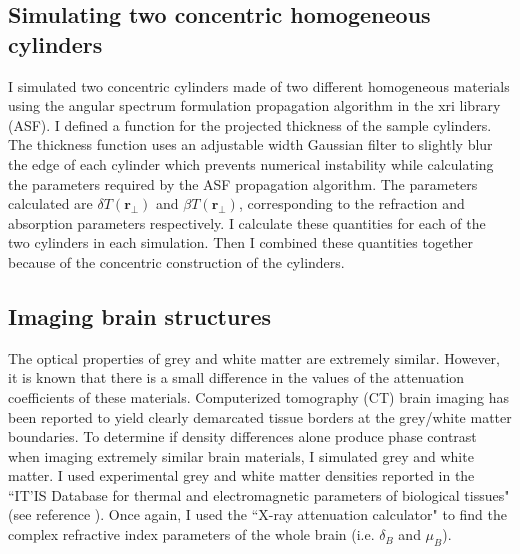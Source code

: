 \documentclass[10pt, a4paper, singlespacing]{report}
\begin{document}

\subsection{Simulating two concentric homogeneous cylinders}\label{2 cylinders}
I simulated two concentric cylinders made of two different homogeneous materials using the angular spectrum formulation propagation algorithm in the xri library (ASF). I defined a function for the projected thickness of the sample cylinders. The thickness function uses an adjustable width Gaussian filter to slightly blur the edge of each cylinder which prevents numerical instability while calculating the parameters required by the ASF propagation algorithm. The parameters calculated are $\delta T(\mathbf{r}_{\perp})$ and $\beta T(\mathbf{r}_{\perp})$, corresponding to the refraction and absorption parameters respectively. I calculate these quantities for each of the two cylinders in each simulation. Then I combined these quantities together because of the concentric construction of the cylinders.


\subsection{Imaging brain structures}\label{Brainz}
The optical properties of grey and white matter are extremely similar. However, it is known that there is a small difference in the values of the attenuation coefficients of these materials. Computerized tomography (CT) brain imaging has been reported to yield clearly demarcated tissue borders at the grey/white matter boundaries\cite{Beltran2}. To determine if density differences alone produce phase contrast when imaging extremely similar brain materials, I simulated grey and white matter. I used experimental grey and white matter densities reported in the ``IT’IS Database for thermal and electromagnetic parameters of biological tissues" (see reference \cite{ITIS}). Once again, I used the ``X-ray attenuation calculator" to find the complex refractive index parameters of the whole brain (i.e. $\delta_B$ and $\mu_B$). 
\end{document}
